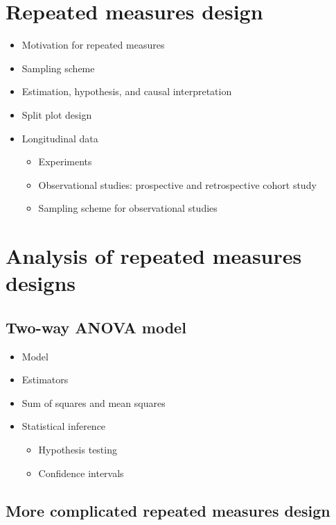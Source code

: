 \documentclass[12pt,]{book}
\providecommand{\tightlist}{%
  \setlength{\itemsep}{0pt}\setlength{\parskip}{0pt}}
\begin{document}
\section{Repeated measures design}\label{repeated-measures-design}

\begin{itemize}
\tightlist
\item
  Motivation for repeated measures
\item
  Sampling scheme
\item
  Estimation, hypothesis, and causal interpretation
\item
  Split plot design
\item
  Longitudinal data

  \begin{itemize}
  \tightlist
  \item
    Experiments
  \item
    Observational studies: prospective and retrospective cohort study
  \item
    Sampling scheme for observational studies
  \end{itemize}
\end{itemize}

\section{Analysis of repeated measures
designs}\label{analysis-of-repeated-measures-designs}

\subsection{Two-way ANOVA model}\label{two-way-anova-model}

\begin{itemize}
\tightlist
\item
  Model
\item
  Estimators
\item
  Sum of squares and mean squares
\item
  Statistical inference

  \begin{itemize}
  \tightlist
  \item
    Hypothesis testing
  \item
    Confidence intervals
  \end{itemize}
\end{itemize}

\subsection{More complicated repeated measures
design}\label{more-complicated-repeated-measures-design}
\end{document}
